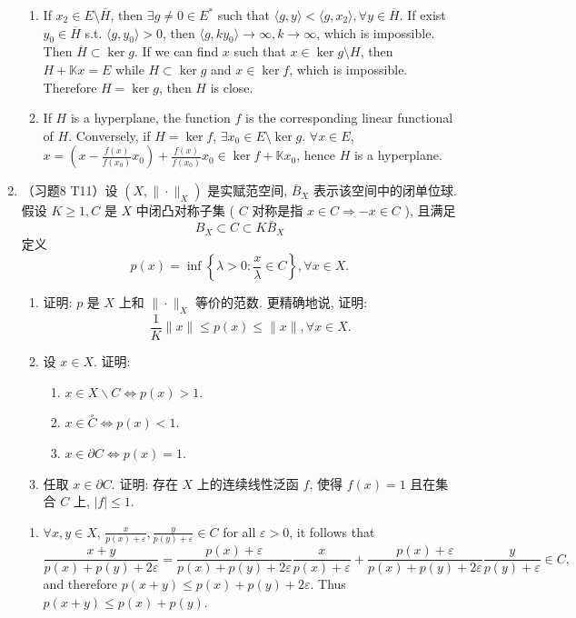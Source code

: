 \begin{enumerate}
\begin{answer}
\begin{enumerate}
        \item If $x_2\in E\setminus \overline H$, then $\exists g\neq  0 \in E^*$ such that $\langle g, y\rangle < \langle g, x_2\rangle, \forall y \in \overline H$. If exist $y_0\in \overline H$ s.t. $\langle g, y_0 \rangle > 0$, then $\langle g, k y_0\rangle\to \infty, k\to\infty$, which is impossible. Then $\overline H \subset \ker g$. If we can find $x$ such that $ x\in \ker g\setminus H$, then $H + \mathbb K x = E$ while $H\subset \ker g$ and $x\in \ker f$, which is impossible. Therefore $H = \ker g$, then $H$ is close.
        \item If $H$ is a hyperplane, the function $f$ is the corresponding linear functional of $H$. Conversely, if $H = \ker f$, $\exists x_0\in E\setminus \ker g$. $\forall x \in E$, $x = (x - \frac{f(x)}{f(x_0)}x_0) + \frac{f(x)}{f(x_0)}x_0\in \ker f + \mathbb K x_0$, hence $H$ is a hyperplane.
    \end{enumerate}
    \end{answer}
  \item （习题8 T11）设 $\left(X,\|\cdot\|_{X}\right)$ 是实赋范空间, $\bar{B}_{X}$ 表示该空间中的闭单位球. 假设 $K \geqslant 1, C$ 是 $X$ 中闭凸对称子集 ( $C$ 对称是指 $x \in C \Longrightarrow-x \in C$ ), 且满足
    $$
    B_{X} \subset C \subset K \bar{B}_{X}
    $$
    定义
    $$
    p(x)=\inf \left\{\lambda>0: \frac{x}{\lambda} \in C\right\}, \forall x \in X .
    $$
    \begin{enumerate}
        \item 证明: $p$ 是 $X$ 上和 $\|\cdot\|_{X}$ 等价的范数. 更精确地说, 证明:
        $$
        \frac{1}{K}\|x\| \leqslant p(x) \leqslant\|x\|, \forall x \in X .
        $$
        \item 设 $x \in X$. 证明:\begin{enumerate}
            \item $x \in X \backslash C \Longleftrightarrow p(x)>1$.
            \item $x \in \stackrel{\circ}{C} \Longleftrightarrow p(x)<1$.
            \item $x \in \partial C \Longleftrightarrow p(x)=1$.
        \end{enumerate}
        \item 任取 $x \in \partial C$. 证明: 存在 $X$ 上的连续线性泛函 $f$, 使得 $f(x)=1$ 且在集 合 $C$ 上, $|f| \leqslant 1$.
    \end{enumerate}
    \begin{answer}
      \begin{enumerate}
        \item $\forall x, y\in X$, $\frac{x}{p(x) + \varepsilon}, \frac{y}{p(y) + \varepsilon}\in C$ for all $\varepsilon > 0$, it follows that
        \[\frac{x + y}{p(x) + p(y) + 2\varepsilon} = \frac{p(x) + \varepsilon}{p(x) + p(y) + 2\varepsilon}\frac{x}{p(x) + \varepsilon} + \frac{p(x) + \varepsilon}{p(x) + p(y) + 2\varepsilon}\frac{y}{p(y) + \varepsilon}\in C, \]
        and therefore $p(x+y) \leq p(x) + p(y) + 2\varepsilon$. Thus $p(x + y) \leq p(x) + p(y)$.
    

\end{enumerate}
\end{answer}
\end{enumerate}
